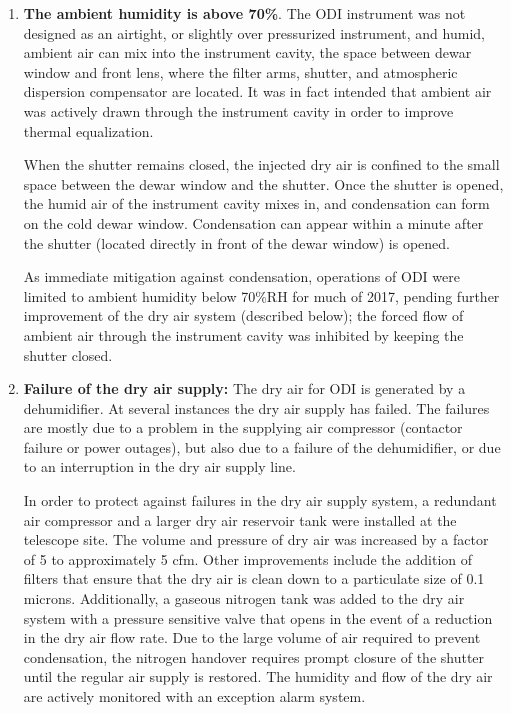 \documentclass[]{spieman}
\begin{document}
\begin{enumerate}

\item {\bf The ambient humidity is above 70\%}. The ODI instrument was
not designed as an airtight, or slightly over pressurized instrument, and humid,
ambient air can mix into the instrument cavity, the space between dewar window
and front lens, where the filter arms, shutter, and atmospheric dispersion
compensator are located. It was in fact intended that ambient air was actively
drawn through	the instrument cavity in order to improve thermal equalization.

When the shutter remains closed, the
injected dry air is confined to the small space between the dewar window and
the shutter. Once the shutter is opened, the  humid air of the instrument cavity
mixes in, and condensation can form on the cold dewar window. Condensation can
appear within a minute after the shutter (located directly in front of the 
dewar window) is opened.

As immediate mitigation against condensation, operations of ODI were limited to
ambient humidity below 70\%RH for much of 2017, pending further improvement of the dry air system (described below); the forced flow of ambient air through the instrument cavity was inhibited by keeping the shutter closed.

\item {\bf Failure of the dry air supply:} The dry air for ODI is generated by a
dehumidifier. At several instances the dry air supply has failed. The failures are 
mostly due to a problem in the supplying air compressor (contactor failure or power outages),
but also due to a failure of the dehumidifier, or due to an interruption in the
dry air supply line. 

In order to protect against failures in the dry air supply system,
a redundant air compressor and a larger dry air reservoir tank were installed at
the telescope site. The volume and pressure of dry air was increased by a factor of 5 to approximately 5 cfm. Other improvements include the addition of filters that ensure that the dry air is clean down to a particulate size of 0.1 microns. Additionally, a gaseous nitrogen tank was added to the dry air system with
a pressure sensitive valve that opens in the event of a reduction in the dry air
flow rate. Due to the large volume of air required to prevent condensation, the
nitrogen handover requires prompt closure of the shutter until the regular air
supply is restored. The humidity and flow of the dry air are actively
monitored with an exception alarm system.


\end{enumerate}
\end{document}
